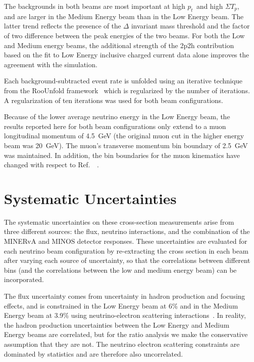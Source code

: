 \documentclass[aps,prl,twocolumn,showpacs,superscriptaddress, floatfix,10pt]{revtex4-2}
\newcommand{\pt}{\ensuremath{p_{t}}}
\newcommand{\sumtp}{\ensuremath{\Sigma T_{p}}}
\begin{document}
The backgrounds in both beams are most important at high \pt\ and high \sumtp, and are larger in the Medium Energy beam than in the Low Energy beam.  The latter trend reflects the presence of the $\Delta$ invariant mass threshold and the factor of two difference between the peak energies of the two beams.  For both the Low and Medium energy beams, the additional strength of the 2p2h contribution based on the fit to Low Energy inclusive charged current data alone improves the agreement with the simulation.  

Each background-subtracted event rate is unfolded using an iterative technique~\citep{D'Agostini:1994zf} from the RooUnfold framework~\citep{Adye:2011gm} which is regularized by the number of iterations. A regularization of ten iterations was used for both beam configurations.  

Because of the lower average neutrino energy in the Low Energy beam, the results reported here for both beam configurations only extend to a muon longitudinal momentum of 4.5~GeV (the original muon cut in the higher energy beam was 20~GeV).  The muon's transverse momentum bin boundary of 2.5~GeV was maintained.  In addition, the bin boundaries for the muon kinematics have changed with respect to Ref.~~\cite{MINERvA:2022mnw}.   

\section{Systematic Uncertainties}

The systematic uncertainties on these cross-section measurements arise from three different sources:  the flux, neutrino interactions, and the combination of the MINERvA and MINOS detector responses.  These uncertainties are evaluated for each neutrino beam configuration by re-extracting the cross section in each beam after varying each source of uncertainty, so that the correlations between different bins (and the correlations between the low and medium energy beam) can be incorporated.  

The flux uncertainty comes from uncertainty in hadron production and focusing effects, and is constrained in the Low Energy beam at 6\% and in the Medium Energy beam at 3.9\% using neutrino-electron scattering interactions~\cite{Park:2015eqa,MINERvA:2022vmb}. 
In reality, the hadron production uncertainties between the Low Energy and Medium Energy beams are correlated, but for the ratio analysis we make the conservative assumption that they are not.  The neutrino electron scattering constraints are dominated by statistics and are therefore also uncorrelated.  
\end{document}
